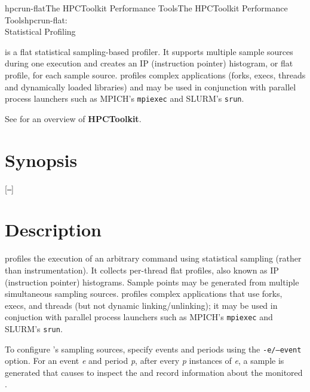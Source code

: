 \documentclass[english]{article}
\begin{document}
\begin{Name}{1}{hpcrun-flat}{The HPCToolkit Performance Tools}{The HPCToolkit Performance Tools}{hpcrun-flat:\\ Statistical Profiling}

 is a flat statistical sampling-based profiler.
It supports multiple sample sources during one execution and creates an IP (instruction pointer) histogram, or flat profile, for each sample source.
 profiles complex applications (forks, execs, threads and dynamically loaded libraries) and may be used in conjunction with parallel process launchers such as MPICH's \texttt{mpiexec} and SLURM's \texttt{srun}.

See  for an overview of \textbf{HPCToolkit}.


\end{Name}

\section{Synopsis}

  [\texttt{--}]  

 

\section{Description}

 profiles the execution of an arbitrary command  using statistical sampling (rather than instrumentation).
It collects per-thread flat profiles, also known as IP (instruction pointer) histograms.
Sample points may be generated from multiple simultaneous sampling sources.
 profiles complex applications that use forks, execs, and threads (but not dynamic linking/unlinking); it may be used in conjuction with parallel process launchers such as MPICH's \texttt{mpiexec} and SLURM's \texttt{srun}.

To configure 's sampling sources, specify events and periods using the \texttt{-e/--event} option.
For an event \emph{e} and period \emph{p}, after every \emph{p} instances of \emph{e}, a sample is generated that causes  to inspect the and record information about the monitored .
\end{document}
